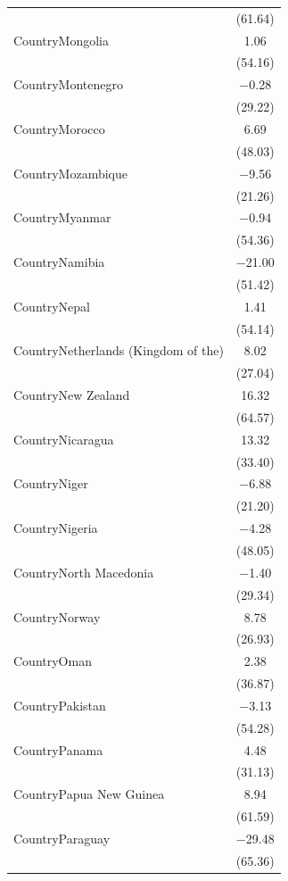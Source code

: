 \documentclass[
  letterpaper,
  DIV=11,
  numbers=noendperiod]{scrartcl}
\begin{document}
\begin{table}
{\begin{tabular}[t]{lc}
 & (\num{61.64})\\
CountryMongolia & \num{1.06}\\
 & (\num{54.16})\\
CountryMontenegro & \num{-0.28}\\
 & (\num{29.22})\\
CountryMorocco & \num{6.69}\\
 & (\num{48.03})\\
CountryMozambique & \num{-9.56}\\
 & (\num{21.26})\\
CountryMyanmar & \num{-0.94}\\
 & \vphantom{1} (\num{54.36})\\
CountryNamibia & \num{-21.00}\\
 & (\num{51.42})\\
CountryNepal & \num{1.41}\\
 & (\num{54.14})\\
CountryNetherlands (Kingdom of the) & \num{8.02}\\
 & (\num{27.04})\\
CountryNew Zealand & \num{16.32}\\
 & (\num{64.57})\\
CountryNicaragua & \num{13.32}\\
 & (\num{33.40})\\
CountryNiger & \num{-6.88}\\
 & (\num{21.20})\\
CountryNigeria & \num{-4.28}\\
 & (\num{48.05})\\
CountryNorth Macedonia & \num{-1.40}\\
 & (\num{29.34})\\
CountryNorway & \num{8.78}\\
 & (\num{26.93})\\
CountryOman & \num{2.38}\\
 & \vphantom{1} (\num{36.87})\\
CountryPakistan & \num{-3.13}\\
 & (\num{54.28})\\
CountryPanama & \num{4.48}\\
 & (\num{31.13})\\
CountryPapua New Guinea & \num{8.94}\\
 & \vphantom{1} (\num{61.59})\\
CountryParaguay & \num{-29.48}\\
 & (\num{65.36})\\

\end{tabular}}
\end{table}
\end{document}
